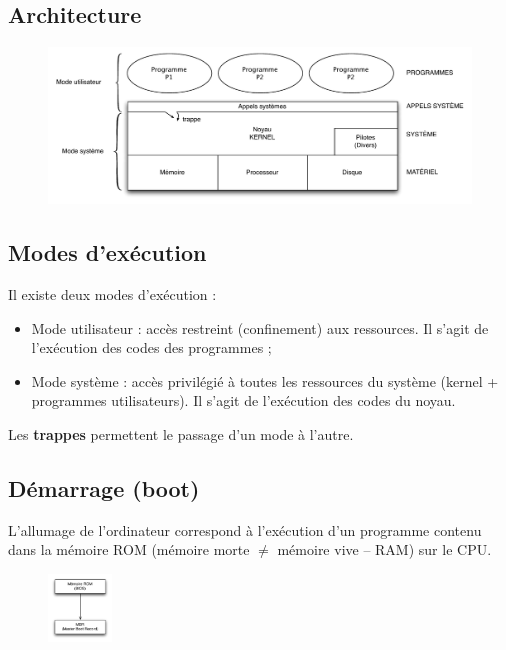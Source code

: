 \documentclass[11pt,english,french]{scrreprt}
\theoremstyle{remark}
\theoremstyle{definition}
\begin{document}
\subsection{Architecture} %
\begin{figure}[h!]
	\center
	\includegraphics[scale=.75]{img/os}
\end{figure}

\subsection{Modes d'exécution} %
Il existe deux modes d'exécution : \begin{itemize}
	\item Mode utilisateur : accès restreint (confinement) aux ressources. Il s'agit de l'exécution des codes des programmes ;
	\item Mode système : accès privilégié à toutes les ressources du système (kernel + programmes utilisateurs). Il s'agit de l'exécution des codes du noyau.
\end{itemize}

Les \textbf{trappes} permettent le passage d'un mode à l'autre.

\subsection{Démarrage (boot)} %

L'allumage de l'ordinateur correspond à l'exécution d'un programme contenu dans la mémoire ROM (mémoire morte $\neq$ mémoire vive -- RAM) sur le CPU.

\begin{figure}
  \vspace{-30pt}
  \begin{center}
    \includegraphics[width=0.15\textwidth]{img/boot}
  \end{center}
  \vspace{-45pt}
\end{figure}
\end{document}
